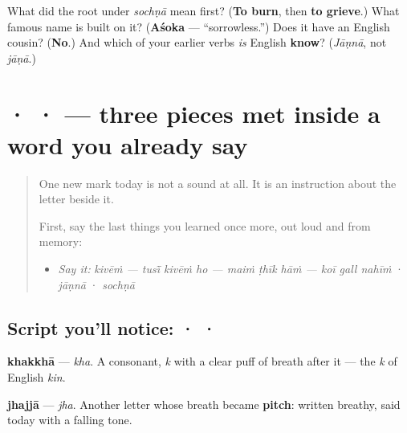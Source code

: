 \begin{tcolorbox}[breakable,colback=teal!4,colframe=teal!35!black,title={Before you move on}]
What did the root under \emph{sochṇā} mean first? (\textbf{To burn}, then \textbf{to grieve}.) What famous name is built on it? (\textbf{Aśoka} — “sorrowless.”) Does it have an English cousin? (\textbf{No}.) And which of your earlier verbs \emph{is} English \textbf{know}? (\emph{Jāṇnā}, not \emph{jāṇā}.)
\end{tcolorbox}
\section[\texorpdfstring{\pa{ਖ} · \pa{ਝ} · \pa{੍} (kha · jha · (no vowel))}{ਖ · ਝ · ੍ (kha · jha · (no vowel))}]{ ·  ·  — three pieces met inside a word you already say}

\label{lesson:PA-S08-khakkha-jhajja-pairin}



\begin{quote}
One new mark today is not a sound at all. It is an instruction about the letter beside it.

First, say the last things you learned once more, out loud and from memory:

\begin{itemize}
\raggedright
  \item \emph{Say it:} \emph{kivēṁ — tusī̃ kivēṁ ho — maiṁ ṭhīk hāṁ — koī gall nahīṁ} · \emph{jāṇnā} · \emph{sochṇā}
\end{itemize}
\end{quote}

\subsection*{Script you'll notice:  ·  · }
\begin{quote}
\end{quote}

\textbf{khakkhā} — \emph{kha}. A consonant, \emph{k} with a clear puff of breath after it — the \emph{k} of English \emph{kin}.

\begin{quote}
\end{quote}

\textbf{jhajjā} — \emph{jha}. Another letter whose breath became \textbf{pitch}: written breathy, said today with a falling tone.

\begin{quote}
\end{quote}

